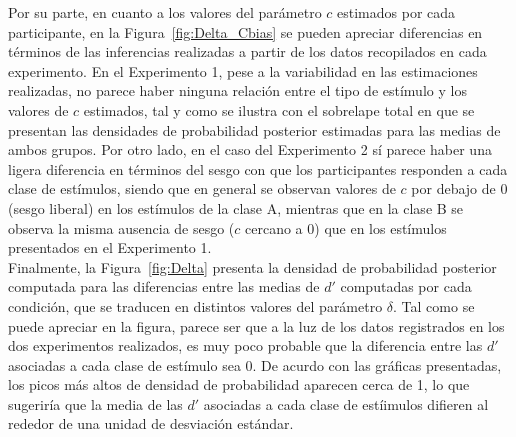 Por su parte, en cuanto a los valores del parámetro $c$ estimados por cada participante, en la Figura~\ref{fig:Delta_Cbias} se pueden apreciar diferencias en términos de las inferencias realizadas a partir de los datos recopilados en cada experimento. En el Experimento 1, pese a la variabilidad en las estimaciones realizadas, no parece haber ninguna relación entre el tipo de estímulo y los valores de $c$ estimados, tal y como se ilustra con el sobrelape total en que se presentan las densidades de probabilidad posterior estimadas para las medias de ambos grupos. Por otro lado, en el caso del Experimento 2 sí parece haber una ligera diferencia en términos del sesgo con que los participantes responden a cada clase de estímulos, siendo que en general se observan valores de $c$ por debajo de 0 (sesgo liberal) en los estímulos de la clase A, mientras que en la clase B se observa la misma ausencia de sesgo ($c$ cercano a $0$) que en los estímulos presentados en el Experimento 1.\\

Finalmente, la Figura~\ref{fig:Delta} presenta la densidad de probabilidad posterior computada para las diferencias entre las medias de $d'$ computadas por cada condición, que se traducen en distintos valores del parámetro $\delta$. Tal como se puede apreciar en la figura, parece ser que a la luz de los datos registrados en los dos experimentos realizados, es muy poco probable que la diferencia entre las $d'$ asociadas a cada clase de estímulo sea 0. De acurdo con las gráficas presentadas, los picos más altos de densidad de probabilidad aparecen cerca de 1, lo que sugeriría que la media de las $d'$ asociadas a cada clase de estíimulos difieren al rededor de una unidad de desviación estándar.\\

